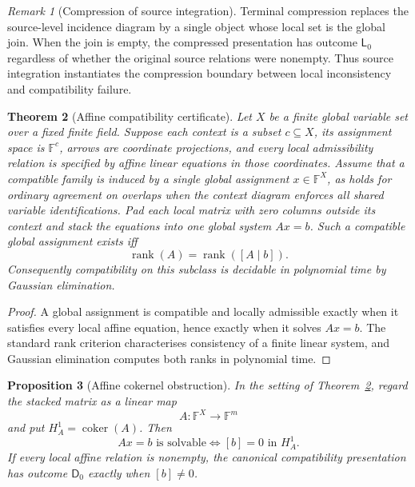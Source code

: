 \documentclass[11pt]{article}
\theoremstyle{plain}
\newtheorem{theorem}{Theorem}[section]
\newtheorem{proposition}[theorem]{Proposition}
\theoremstyle{definition}
\theoremstyle{remark}
\newtheorem{remark}[theorem]{Remark}
\begin{document}
\begin{remark}[Compression of source integration]
Terminal compression replaces the source-level incidence diagram by a single
object whose local set is the global join. When the join is empty, the compressed
presentation has outcome $\mathsf L_0$ regardless of whether the original source
relations were nonempty. Thus source integration instantiates the compression
boundary between local inconsistency and compatibility failure.
\end{remark}

\begin{theorem}[Affine compatibility certificate]\label{thm:affine-certificate}
Let $X$ be a finite global variable set over a fixed finite field. Suppose each
context is a subset $c\subseteq X$, its assignment space is $\mathbb F^c$,
arrows are coordinate projections, and every local admissibility relation is
specified by affine linear equations in those coordinates. Assume that a
compatible family is induced by a single global assignment $x\in\mathbb F^X$,
as holds for ordinary agreement on overlaps when the context diagram enforces all
shared variable identifications. Pad each local matrix with zero columns outside its context and stack the
equations into one global system $Ax=b$. Such a compatible global assignment
exists iff
\[
\operatorname{rank}(A)=\operatorname{rank}([A\mid b]).
\]
Consequently compatibility on this subclass is decidable in polynomial time by
Gaussian elimination.
\end{theorem}

\begin{proof}
A global assignment is compatible and locally admissible exactly when it
satisfies every local affine equation, hence exactly when it solves $Ax=b$.
The standard rank criterion characterises consistency of a finite linear system,
and Gaussian elimination computes both ranks in polynomial time.
\end{proof}


\begin{proposition}[Affine cokernel obstruction]\label{prop:affine-cokernel}
In the setting of Theorem~\ref{thm:affine-certificate}, regard the stacked
matrix as a linear map
\[
A:\mathbb F^X\longrightarrow\mathbb F^m
\]
and put $H_A^1=\operatorname{coker}(A)$. Then
\[
Ax=b\text{ is solvable}
\iff [b]=0\text{ in }H_A^1.
\]
If every local affine relation is nonempty, the canonical compatibility
presentation has outcome $\mathsf D_0$ exactly when $[b]\ne0$.
\end{proposition}
\end{document}
